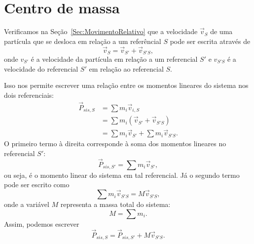 \section{Centro de massa}
\label{Sec:CentroDeMassa}

Verificamos na Seção~\ref{Sec:MovimentoRelativo} que a velocidade $\vec{v}_S$ de uma partícula que se desloca em relação a um referêncial $S$ pode ser escrita através de
\begin{equation}
     \vec{v}_S = \vec{v}_{S'} + \vec{v}_{S'S},
\end{equation}
%
onde $v_{S'}$ é a velocidade da partícula em relação a um referencial $S'$ e $v_{S'S}$ é a velocidade do referencial $S'$ em relação ao referencial $S$.

Isso nos permite escrever uma relação entre os momentos lineares do sistema nos dois referenciais:
\begin{align}
    \vec{P}_{sis, S} &= \sum m_i \vec{v}_{i,S} \\
    &= \sum m_i (\vec{v}_{S'} + \vec{v}_{S'S}) \\
    &= \sum m_i \vec{v}_{S'} + \sum m_i \vec{v}_{S'S}.
\end{align}
%
O primeiro termo à direita corresponde à soma dos momentos lineares no referencial $S'$:
\begin{equation}
    \vec{P}_{sis, S'} = \sum m_i \vec{v}_{S'},
\end{equation}
%
ou seja, é o momento linear do sistema em tal referencial. Já o segundo termo pode ser escrito como
\begin{equation}
    \sum m_i \vec{v}_{S'S} = M \vec{v}_{S'S},
\end{equation}
%
onde a variável $M$ representa a massa total do sistema:
\begin{equation}
    M = \sum m_i.
\end{equation}
%
Assim, podemos escrever
\begin{equation}
    \vec{P}_{sis, S} = \vec{P}_{sis, S'} + M \vec{v}_{S'S}.
\end{equation}

